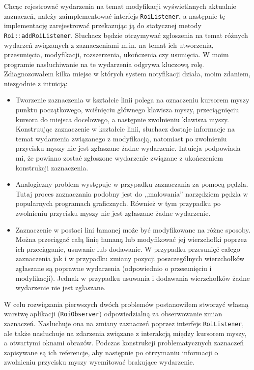 \documentclass[declaration,shortabstract,mgr]{iithesis}
\begin{document}
Chcąc rejestrować wydarzenia na temat modyfikacji wyświetlanych aktualnie zaznaczeń, należy zaimplementować interfejs \texttt{RoiListener}, a następnie tę implementację zarejestrować przekazując ją do statycznej metody \texttt{Roi::addRoiListener}.
Słuchacz będzie otrzymywać zgłoszenia na temat różnych wydarzeń związanych z zaznaczeniami m.in. na temat ich utworzenia, przesunięcia, modyfikacji, rozszerzenia, ukończenia czy usunięcia.
W moim programie nasłuchiwanie na te wydarzenia odgrywa kluczową rolę.
Zdiagnozowałem kilka miejsc w których system notyfikacji działa, moim zdaniem, niezgodnie z intuicją:
\begin{itemize}
  \item Tworzenie zaznaczenia w kształcie linii polega na oznaczeniu kursorem myszy punktu początkowego, wciśnięciu głównego klawisza myszy, przeciągnięciu kursora do miejsca docelowego, a następnie zwolnieniu klawisza myszy. Konstruując zaznaczenie w kształcie linii, słuchacz dostaje informacje na temat wydarzenia związanego z modyfikacją, natomiast po zwolnieniu przycisku myszy nie jest zgłaszane żadne wydarzenie. Intuicja podpowiada mi, że powinno zostać zgłoszone wydarzenie związane z ukończeniem konstrukcji zaznaczenia.
  \item Analogiczny problem występuje w przypadku zaznaczania za pomocą pędzla. Tutaj proces zaznaczania podobny jest do ,,malowania'' narzędziem pędzla w popularnych programach graficznych. Również w tym przypadku po zwolnieniu przycisku myszy nie jest zgłaszane żadne wydarzenie.
  \item Zaznaczenie w postaci lini łamanej może być modyfikowane na różne sposoby. Można przeciągać całą linię łamaną lub modyfikować jej wierzchołki poprzez ich przeciąganie, usuwanie lub dodawanie. W przypadku przesunięć całego zaznaczenia jak i w przypadku zmiany pozycji poszczególnych wierzchołków zgłaszane są poprawne wydarzenia (odpowiednio o przesunięciu i modyfikacji). Jednak w przypadku usuwania i dodawania wierzchołków żadne wydarzenie nie jest zgłaszane.
\end{itemize}

W celu rozwiązania pierwszych dwóch problemów postanowiłem stworzyć własną warstwę aplikacji (\texttt{RoiObserver}) odpowiedzialną za obserwowanie zmian zaznaczeń.
Nasłuchuje ona na zmiany zaznaczeń poprzez interfejs \texttt{RoiListener}, ale także nasłuchuje na zdarzenia związane z interakcją między kursorem myszy, a otwartymi oknami obrazów.
Podczas konstrukcji problematycznych zaznaczeń zapisywane są ich referencje, aby następnie po otrzymaniu informacji o zwolnieniu przycisku myszy wyemitować brakujące wydarzenie.
\end{document}
